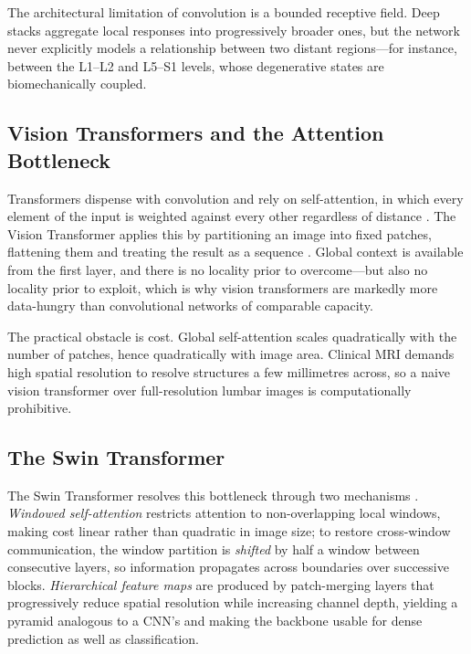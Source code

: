 The architectural limitation of convolution is a bounded receptive field. Deep
stacks aggregate local responses into progressively broader ones, but the
network never explicitly models a relationship between two distant regions---for
instance, between the L1--L2 and L5--S1 levels, whose degenerative states are
biomechanically coupled.

\subsection{Vision Transformers and the Attention Bottleneck}
\label{sec:lr-vit}

Transformers dispense with convolution and rely on self-attention, in which
every element of the input is weighted against every other regardless of
distance \cite{vaswani2017attention}. The Vision Transformer applies this by
partitioning an image into fixed patches, flattening them and treating the
result as a sequence \cite{dosovitskiy2021image}. Global context is available
from the first layer, and there is no locality prior to overcome---but also no
locality prior to exploit, which is why vision transformers are markedly more
data-hungry than convolutional networks of comparable capacity.

The practical obstacle is cost. Global self-attention scales quadratically with
the number of patches, hence quadratically with image area. Clinical MRI demands
high spatial resolution to resolve structures a few millimetres across, so a
naive vision transformer over full-resolution lumbar images is computationally
prohibitive.

\subsection{The Swin Transformer}
\label{sec:lr-swin}

The Swin Transformer resolves this bottleneck through two mechanisms
\cite{liu2021swin}. \emph{Windowed self-attention} restricts attention to
non-overlapping local windows, making cost linear rather than quadratic in image
size; to restore cross-window communication, the window partition is
\emph{shifted} by half a window between consecutive layers, so information
propagates across boundaries over successive blocks. \emph{Hierarchical feature
maps} are produced by patch-merging layers that progressively reduce spatial
resolution while increasing channel depth, yielding a pyramid analogous to a
CNN's and making the backbone usable for dense prediction as well as
classification.

